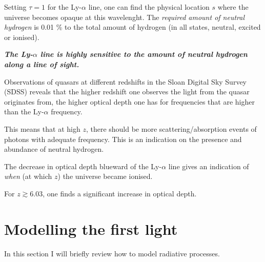 \documentclass[ignorenonframetext]{beamer}
\begin{document}
Setting $\tau = 1$ for the Ly-$\alpha$ line, one can find the physical location $s$ where the universe becomes opaque at this wavelenght. The \textit{required amount of neutral hydrogen} is 0.01 \% to the total amount of hydrogen (in all states, neutral, excited or ionised).

{\center
    \textit{\textbf{The Ly-$\alpha$ line is highly sensitive to the amount of neutral hydrogen along a line of sight.}}
}

Observations of quasars at different redshifts in the Sloan Digital Sky Survey (SDSS) reveals that the higher redshift one observes the light from the quasar originates from, the higher optical depth one has for frequencies that are higher than the Ly-$\alpha$ frequency. 

This means that at high $z$, there should be more scattering/absorption events of photons with adequate frequency. This is an indication on the presence and abundance of neutral hydrogen. 

The decrease in optical depth blueward of the Ly-$\alpha$ line gives an indication of \textit{when} (at which $z$) the universe became ionised. 

For $z \gtrsim 6.03$, one finds a significant increase in optical depth.

\section{Modelling the first light}
In this section I will briefly review how to model radiative processes.
\end{document}
